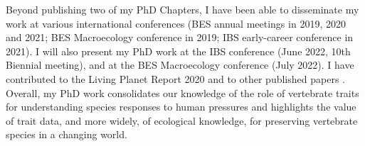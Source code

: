 Beyond publishing two of my PhD Chapters, I have been able to disseminate my work at various international conferences (BES annual meetings in 2019, 2020 and 2021; BES Macroecology conference in 2019; IBS early-career conference in 2021). I will also present my PhD work at the IBS conference (June 2022, 10th Biennial meeting), and at the BES Macroecology conference (July 2022). I have contributed to the Living Planet Report 2020 \citep{WWF2020} and to other published papers \citep{Newbold2019, Newbold2020}. Overall, my PhD work consolidates our knowledge of the role of vertebrate traits for understanding species responses to human pressures and highlights the value of trait data, and more widely, of ecological knowledge, for preserving vertebrate species in a changing world.